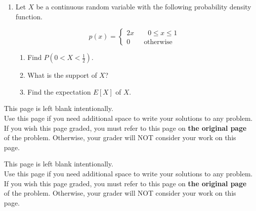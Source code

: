 \documentclass[11pt]{article}
\begin{document}
\begin{enumerate}

\item Let $X$ be a continuous random variable with the following probability density function.

\[p(x)=\begin{cases}2x\qquad 0\le x\le 1\\ 0 \qquad \text{otherwise}\end{cases}\]

\begin{enumerate}
    \item Find $P(0<X<\frac{1}{2})$.
    \vfill

    \item What is the support of $X$?

    \vfill

    \item Find the expectation $E[X]$ of $X$.

    \vfill
    


    \vfill
\end{enumerate}


\end{enumerate}

\newpage

This page is left blank intentionally.\\

Use this page if you need additional space to write your solutions to any problem. \\

If you wish this page graded, you must refer to this page on \textbf{the original page} of the problem. Otherwise, your grader will NOT consider your work on this page.

\newpage

This page is left blank intentionally.\\

Use this page if you need additional space to write your solutions to any problem. \\

If you wish this page graded, you must refer to this page on \textbf{the original page} of the problem. Otherwise, your grader will NOT consider your work on this page.
\end{document}
